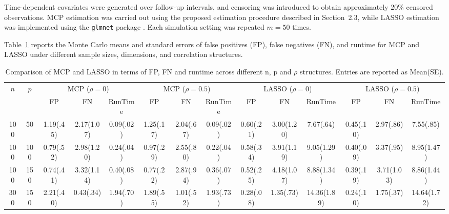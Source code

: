\documentclass[twoside]{article}
\begin{document}
Time-dependent covariates were generated over follow-up intervals, and censoring was introduced to obtain approximately 20\% censored observations. MCP estimation was carried out using the proposed estimation procedure described in Section~2.3, while LASSO estimation was implemented using the \texttt{glmnet} package \cite{simon2011regularization}. Each simulation setting was repeated $m=50$ times.

Table~\ref{tab:sim} reports the Monte Carlo means and standard errors of false positives (FP), false negatives (FN), and runtime for MCP and LASSO under different sample sizes, dimensions, and correlation structures.


\begin{table}[h]
	\centering
	\tiny
	\setlength{\tabcolsep}{2pt}
	
	\caption{Comparison of MCP and LASSO in terms of FP, FN and runtime across different n, p and $\rho$ structures. Entries are reported as Mean(SE).}
	\label{tab:sim}
	
	\begin{tabular}{|c|c|ccc|ccc|ccc|ccc|}
		\hline
		$n$ & $p$
		&
		\multicolumn{3}{c|}{MCP ($\rho=0$)}
		&
		\multicolumn{3}{c|}{MCP ($\rho=0.5$)}
		&
		\multicolumn{3}{c|}{LASSO ($\rho=0$)}
		&
		\multicolumn{3}{c|}{LASSO ($\rho=0.5$)}
		\\
		\cline{3-14}
		
		&
		&
		FP & FN & RunTime
		&
		FP & FN & RunTime
		&
		FP & FN & RunTime
		&
		FP & FN & RunTime
		\\
		\hline\hline
		
		100 & 50
		& 1.19(.45) & 2.17(1.07) & 0.09(.02)
		& 1.25(.17) & 2.04(.67) & 0.09(.02)
		& 0.60(.21) & 3.00(1.20) & 7.67(.64)
		& 0.45(.10) & 2.97(.86) & 7.55(.85)
		\\
		\hline
		
		100 & 100
		& 0.79(.52) & 2.98(1.20) & 0.24(.04)
		& 0.97(.29) & 2.55(.80) & 0.22(.04)
		& 0.58(.34) & 3.91(1.19) & 9.05(1.29)
		& 0.40(.09) & 3.37(.95) & 8.95(1.47)
		\\
		\hline
		
		100 & 150
		& 0.74(.41) & 3.32(1.14) & 0.40(.08)
		& 0.77(.22) & 2.87(.94) & 0.36(.07)
		& 0.52(.25) & 4.18(1.07) & 8.88(1.34)
		& 0.39(.19) & 3.71(1.03) & 8.86(1.44)
		\\
		\hline
		
		300 & 150
		& 2.21(.40) & 0.43(.34) & 1.94(.70)
		& 1.89(.55) & 1.01(.52) & 1.93(.73)
		& 0.28(.08) & 1.35(.73) & 14.36(1.89)
		& 0.24(.10) & 1.75(.37) & 14.64(1.72)
		\\
		\hline
		

\end{tabular}
\end{table}
\end{document}
